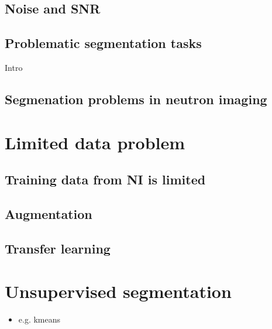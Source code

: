 \documentclass[letterpaper,10pt,english]{sphinxmanual}
\begin{document}
\noindent{}


\section{Noise and SNR}
\label{\detokenize{ML4NeutronImageSegmentation:noise-and-snr}}

\section{Problematic segmentation tasks}
\label{\detokenize{ML4NeutronImageSegmentation:problematic-segmentation-tasks}}
Intro


\section{Segmenation problems in neutron imaging}
\label{\detokenize{ML4NeutronImageSegmentation:segmenation-problems-in-neutron-imaging}}

\chapter{Limited data problem}
\label{\detokenize{ML4NeutronImageSegmentation:limited-data-problem}}

\section{Training data from NI is limited}
\label{\detokenize{ML4NeutronImageSegmentation:training-data-from-ni-is-limited}}

\section{Augmentation}
\label{\detokenize{ML4NeutronImageSegmentation:augmentation}}

\section{Transfer learning}
\label{\detokenize{ML4NeutronImageSegmentation:transfer-learning}}

\chapter{Unsupervised segmentation}
\label{\detokenize{ML4NeutronImageSegmentation:unsupervised-segmentation}}\begin{itemize}
\item {} 
e.g. k\sphinxhyphen{}means

\end{itemize}
\end{document}
